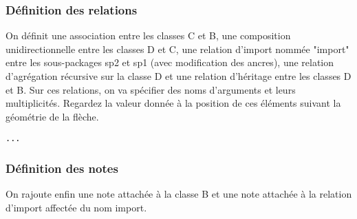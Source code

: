\documentclass[a4paper,11pt]{report}
\newcommand{\inputTikZ}[1]{%
  }%
\newcommand{\inputTikZ}[1]{%
    \texttt{[image: fig/\#1.pdf]}%
  }%
\begin{document}
\vspace{-0.4cm}
{\color{red!70!black}
\vspace{-0.4cm}
}
\vspace{-0.4cm}
{\color{red!70!black}
\vspace{-0.4cm}
}
\vspace{-0.4cm}
{\color{red!70!black}
\vspace{-0.4cm}
}


\begin{center}
\inputTikZ{figure33}
\end{center}


\subsubsection{Définition des relations}

On définit une association entre les classes C et B, une composition unidirectionnelle entre les classes D et C, une relation d'import nommée "import" entre les sous-packages sp2 et sp1 (avec modification des ancres), une relation d'agrégation récursive sur la classe D et une relation d'héritage entre les classes D et B. Sur ces relations, on va spécifier des noms d'arguments et leurs multiplicités. Regardez la valeur donnée à la position de ces éléments suivant la géométrie de la flèche.

\medskip

\hspace{-0.7cm}\lstinline{...}
{\color{red!70!black}

}

\begin{center}
\inputTikZ{figure34}
\end{center}

\subsubsection{Définition des notes}

On rajoute enfin une note attachée à la classe B et une note attachée à la relation d'import affectée du nom import.
\end{document}
